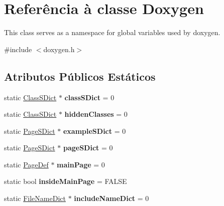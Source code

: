 \hypertarget{class_doxygen}{\section{Referência à classe Doxygen}
\label{class_doxygen}
}


This class serves as a namespace for global variables used by doxygen.  




{\ttfamily \#include $<$doxygen.\-h$>$}

\subsection*{Atributos Públicos Estáticos}
\begin{DoxyCompactItemize}
\item 
\hypertarget{class_doxygen_ab38b78878d0fd26776f7f0f072715b0d}{static \hyperlink{class_class_s_dict}{Class\-S\-Dict} $\ast$ {\bfseries class\-S\-Dict} = 0}\label{class_doxygen_ab38b78878d0fd26776f7f0f072715b0d}

\item 
\hypertarget{class_doxygen_a291bb9bf31f0baafab9db7d608868b03}{static \hyperlink{class_class_s_dict}{Class\-S\-Dict} $\ast$ {\bfseries hidden\-Classes} = 0}\label{class_doxygen_a291bb9bf31f0baafab9db7d608868b03}

\item 
\hypertarget{class_doxygen_a5db683e78914d8aff67e925fff195ea2}{static \hyperlink{class_page_s_dict}{Page\-S\-Dict} $\ast$ {\bfseries example\-S\-Dict} = 0}\label{class_doxygen_a5db683e78914d8aff67e925fff195ea2}

\item 
\hypertarget{class_doxygen_a73f317c28b4e47558490385afed23c97}{static \hyperlink{class_page_s_dict}{Page\-S\-Dict} $\ast$ {\bfseries page\-S\-Dict} = 0}\label{class_doxygen_a73f317c28b4e47558490385afed23c97}

\item 
\hypertarget{class_doxygen_a9033adf4d859592f588600611b69a86c}{static \hyperlink{class_page_def}{Page\-Def} $\ast$ {\bfseries main\-Page} = 0}\label{class_doxygen_a9033adf4d859592f588600611b69a86c}

\item 
\hypertarget{class_doxygen_aa2bf95c358c8d7317ee46610d614eba7}{static bool {\bfseries inside\-Main\-Page} = F\-A\-L\-S\-E}\label{class_doxygen_aa2bf95c358c8d7317ee46610d614eba7}

\item 
\hypertarget{class_doxygen_ab914240aa8e8fdbc235030dca63a7f24}{static \hyperlink{class_file_name_dict}{File\-Name\-Dict} $\ast$ {\bfseries include\-Name\-Dict} = 0}\label{class_doxygen_ab914240aa8e8fdbc235030dca63a7f24}


\end{DoxyCompactItemize}
